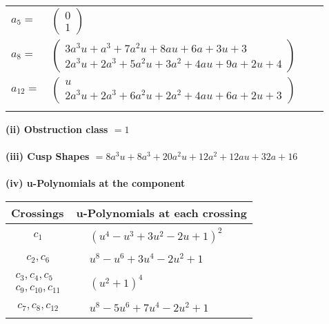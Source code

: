 \documentclass[1p]{elsarticle_modified}
\theoremstyle{definition}
\begin{document}
\begin{tabular}{m{7pt} m{180pt} m{7pt} m{180pt} }
\flushright $a_{5}=$&$\begin{pmatrix}0\\1\end{pmatrix}$ \\
\flushright $a_{8}=$&$\begin{pmatrix}3 a^3 u+a^3+7 a^2 u+8 a u+6 a+3 u+3\\2 a^3 u+2 a^3+5 a^2 u+3 a^2+4 a u+9 a+2 u+4\end{pmatrix}$ \\
\flushright $a_{12}=$&$\begin{pmatrix}u\\2 a^3 u+2 a^3+6 a^2 u+2 a^2+4 a u+6 a+2 u+3\end{pmatrix}$\\&\end{tabular}
\flushleft \textbf{(ii) Obstruction class $= 1$}\\~\\
\flushleft \textbf{(iii) Cusp Shapes $= 8 a^3 u+8 a^3+20 a^2 u+12 a^2+12 a u+32 a+16$}\\~\\
\newpage\renewcommand{\arraystretch}{1}
\flushleft \textbf{(iv) u-Polynomials at the component}\newline \\
\begin{tabular}{m{50pt}|m{274pt}}
Crossings & \hspace{64pt}u-Polynomials at each crossing \\
\hline $$\begin{aligned}c_{1}\end{aligned}$$&$\begin{aligned}
&(u^4- u^3+3 u^2-2 u+1)^2
\end{aligned}$\\
\hline $$\begin{aligned}c_{2},c_{6}\end{aligned}$$&$\begin{aligned}
&u^8- u^6+3 u^4-2 u^2+1
\end{aligned}$\\
\hline $$\begin{aligned}c_{3},c_{4},c_{5}\\c_{9},c_{10},c_{11}\end{aligned}$$&$\begin{aligned}
&(u^2+1)^4
\end{aligned}$\\
\hline $$\begin{aligned}c_{7},c_{8},c_{12}\end{aligned}$$&$\begin{aligned}
&u^8-5 u^6+7 u^4-2 u^2+1
\end{aligned}$\\
\hline
\end{tabular}\\~\\
\end{document}
